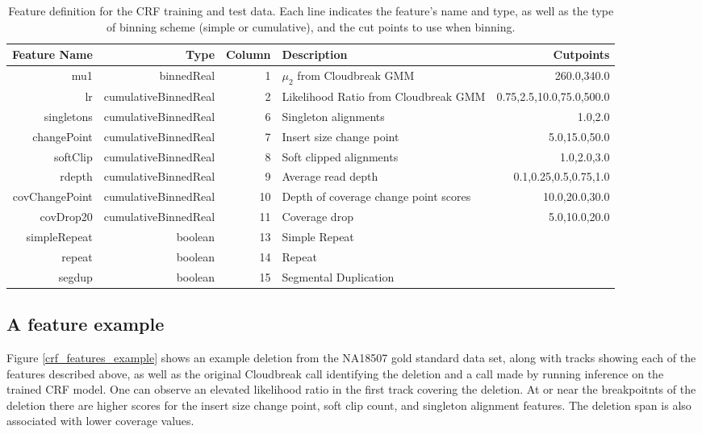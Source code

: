 \begin{table}
\begin{center}
\footnotesize
\begin{tabular}{rrrp{3.5cm}r}
 \hline
Feature Name & Type & Column & Description & Cutpoints \\
 \hline
 mu1 & binnedReal & 1 & $\mu_2$ from Cloudbreak GMM  &  260.0,340.0 \\
 lr &  cumulativeBinnedReal  &  2   & Likelihood Ratio from Cloudbreak GMM &  0.75,2.5,10.0,75.0,500.0 \\
 singletons & cumulativeBinnedReal &  6  & Singleton alignments  &  1.0,2.0 \\
 changePoint & cumulativeBinnedReal & 7 & Insert size change point & 5.0,15.0,50.0 \\
 softClip & cumulativeBinnedReal & 8 & Soft clipped alignments &  1.0,2.0,3.0 \\
 rdepth & cumulativeBinnedReal & 9 & Average read depth & 0.1,0.25,0.5,0.75,1.0 \\
 covChangePoint & cumulativeBinnedReal &  10 & Depth of coverage change point scores &  10.0,20.0,30.0 \\
 covDrop20 &  cumulativeBinnedReal  &  11 & Coverage drop &  5.0,10.0,20.0 \\
 simpleRepeat & boolean &  13  & Simple Repeat & \\
 repeat & boolean &  14  & Repeat & \\
 segdup & boolean &  15  &  Segmental Duplication & \\
 \hline
\end{tabular}
\end{center}
\caption{Feature definition for the CRF training and test data. Each line indicates the feature's name and type, as well as the type of binning scheme (simple or cumulative), and the cut points to use when binning.}
\label{crf_feature_definitions}
\end{table}

\subsection{A feature example}

Figure \ref{crf_features_example} shows an example deletion from the NA18507 gold standard data set, along with tracks showing each of the features described above, as well as the original Cloudbreak call identifying the deletion and a call made by running inference on the trained CRF model. One can observe an elevated likelihood ratio in the first track covering the deletion. At or near the breakpoitnts of the deletion there are higher scores for the insert size change point, soft clip count, and singleton alignment features. The deletion span is also associated with lower coverage values.

